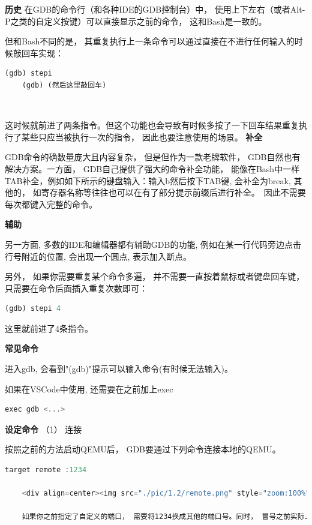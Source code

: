 \textbf{历史}
在GDB的命令行（和各种IDE的GDB控制台）中， 使用上下左右（或者Alt-P之类的自定义按键）可以直接显示之前的命令， 这和Bash是一致的。

但和Bash不同的是， 其重复执行上一条命令可以通过直接在不进行任何输入的时候敲回车实现：

\begin{lstlisting}[language={Rust}, label={code:forktest},
	caption={forktest.rs}]
	(gdb) stepi
	(gdb) (然后这里敲回车)
\end{lstlisting} 

这时候就前进了两条指令。但这个功能也会导致有时候多按了一下回车结果重复执行了某些只应当被执行一次的指令， 因此也要注意使用的场景。
\textbf{补全}

GDB命令的确数量庞大且内容复杂， 但是但作为一款老牌软件， GDB自然也有解决方案。一方面， GDB自己提供了强大的命令补全功能， 能像在Bash中一样TAB补全，例如如下所示的键盘输入：输入b然后按下TAB键, 会补全为break, 其他的， 如寄存器名称等往往也可以在有了部分提示前缀后进行补全。 因此不需要每次都键入完整的命令。

\textbf{辅助}

另一方面, 多数的IDE和编辑器都有辅助GDB的功能, 例如在某一行代码旁边点击行号附近的位置, 会出现一个圆点, 表示加入断点。

另外， 如果你需要重复某个命令多遍， 并不需要一直按着鼠标或者键盘回车键， 只需要在命令后面插入重复次数即可：

\begin{lstlisting}[language={Rust}, label={code:forktest},
	caption={forktest.rs}]
	(gdb) stepi 4
\end{lstlisting}

这里就前进了4条指令。

\textbf{常见命令}

进入gdb, 会看到"(gdb)"提示可以输入命令(有时候无法输入)。

如果在VSCode中使用, 还需要在之前加上exec

\begin{lstlisting}[language={Rust}, label={code:forktest},
	caption={forktest.rs}]
	exec gdb <...>
\end{lstlisting}

\textbf{设定命令}
（1） 连接

按照之前的方法启动QEMU后， GDB要通过下列命令连接本地的QEMU。

\begin{lstlisting}[language={Rust}, label={code:forktest},
	caption={forktest.rs}]
	target remote :1234
	
	<div align=center><img src="./pic/1.2/remote.png" style="zoom:100%"></div> 
	
	如果你之前指定了自定义的端口， 需要将1234换成其他的端口号。同时， 冒号之前实际上省略了localhost（也就是本机的“网址”）, 如果你将来有自定义的地址或者网址， 也可以在前面补上。
\end{lstlisting}

